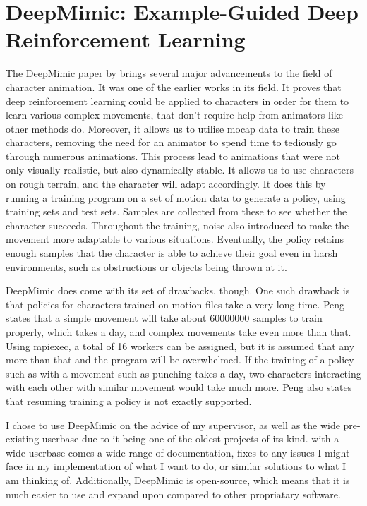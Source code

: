 \documentclass{l4proj}
\begin{document}
\section{DeepMimic: Example-Guided Deep Reinforcement Learning}
The DeepMimic paper by \cite{deepmimic} brings several major advancements to the field of character animation. It was one of the earlier works in its field. It proves that deep reinforcement learning could be applied to characters in order for them to learn various complex movements, that don't require help from animators like other methods do. Moreover, it allows us to utilise mocap data to train these characters, removing the need for an animator to spend time to tediously go through numerous animations. This process lead to animations that were not only visually realistic, but also dynamically stable. It allows us to use characters on rough terrain, and the character will adapt accordingly. It does this by running a training program on a set of motion data to generate a policy, using training sets and test sets. Samples are collected from these to see whether the character succeeds. Throughout the training, noise also introduced to make the movement more adaptable to various situations. Eventually, the policy retains enough samples that the character is able to achieve their goal even in harsh environments, such as obstructions or objects being thrown at it.

DeepMimic does come with its set of drawbacks, though. One such drawback is that policies for characters trained on motion files take a very long time. Peng states that a simple movement will take about 60000000 samples to train properly, which takes a day, and complex movements take even more than that. Using mpiexec, a total of 16 workers can be assigned, but it is assumed that any more than that and the program will be overwhelmed. If the training of a policy such as with a movement such as punching takes a day, two characters interacting with each other with similar movement would take much more. Peng also states that resuming training a policy is not exactly supported.

I chose to use DeepMimic on the advice of my supervisor, as well as the wide pre-existing userbase due to it being one of the oldest projects of its kind. with a wide userbase comes a wide range of documentation, fixes to any issues I might face in my implementation of what I want to do, or similar solutions to what I am thinking of. Additionally, DeepMimic is open-source, which means that it is much easier to use and expand upon compared to other propriatary software.
\clearpage
\end{document}
